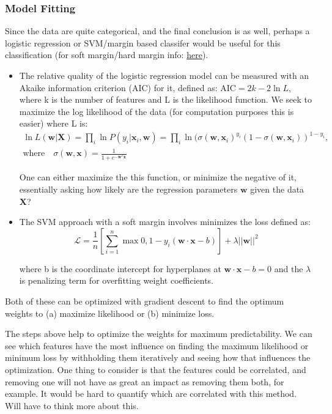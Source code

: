 \documentclass{article}
\begin{document}
\subsubsection{Model Fitting} 
Since the data are quite categorical, and the final conclusion is as well, perhaps a logistic regression or SVM/margin based classifer would be useful for this classification (for soft margin/hard margin info: \href{https://github.com/harvard-ml-courses/cs181-lectures/blob/master/10.handout.pdf}{here}). \begin{itemize}

\item The relative quality of the logistic regression model can be measured with an Akaike information criterion (AIC) for it, defined as: $ \textrm{AIC} = 2k - 2 \ln L$, where k is the number of features and L is the likelihood function. We seek to maximize the log likelihood of the data (for computation purposes this is easier) where L is: \begin{gather}
\ln L(\mathbf{w} | \mathbf{X}) = \prod_{i} \ln P(y_i |\mathbf{x}_i, \mathbf{w}) = \prod_{i} \ln(\sigma(\mathbf{w},\mathbf{x}_i)^{y_i} (1 - \sigma(\mathbf{w},\mathbf{x}_i))^{1-y_i} ,  \\  \textrm{where}  \quad \sigma(\mathbf{w},\mathbf{x}) = \frac{1}{1 +e^{-\mathbf{w}^T \mathbf{x}}} \qquad
\end{gather}

One can either maximize the this function, or minimize the negative of it, essentially asking how likely are the regression parameters $\mathbf{w}$ given the data $\mathbf{X}$?

\item The SVM approach with a soft margin involves minimizes the loss defined as:
\begin{equation}
\mathcal{L} = \frac{1}{n} [\sum_{i=1}^{n} \max{0, 1-y_i (\mathbf{w} \cdot \mathbf{x} - b) }] + \lambda ||\mathbf{w}||^2
\end{equation}

where b is the coordinate intercept for hyperplanes at $\mathbf{w} \cdot \mathbf{x} - b = 0$ and the $\lambda$ is penalizing term for overfitting weight coefficients.
\end{itemize}
Both of these can be optimized with gradient descent to find the optimum weights to (a) maximize likelihood or (b) minimize loss.

The steps above help to optimize the weights for maximum predictability. We can see which features have the most influence on finding the maximum likelihood or minimum loss by withholding them iteratively and seeing how that influences the optimization. One thing to consider is that the features could be correlated, and removing one will not have as great an impact as removing them both, for example. It would be hard to quantify which are correlated with this method. Will have to think more about this. 
\end{document}
